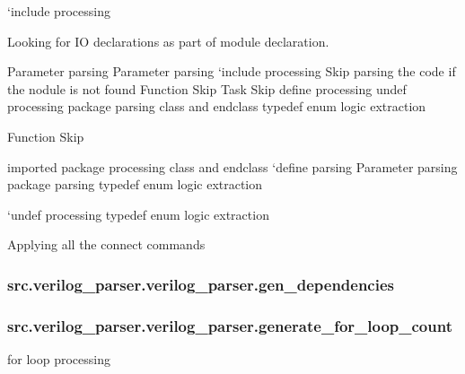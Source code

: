 `include processing

Looking for I\-O declarations as part of module declaration.

Parameter parsing Parameter parsing `include processing Skip parsing the code if the nodule is not found Function Skip Task Skip {\ttfamily define processing }undef processing package parsing class and endclass typedef enum logic extraction

Function Skip

imported package processing class and endclass `define parsing Parameter parsing package parsing typedef enum logic extraction

`undef processing typedef enum logic extraction

Applying all the connect commands \hypertarget{classsrc_1_1verilog__parser_1_1verilog__parser_a9ca2637cb2fee2c2cc14bef5cefbc55c}{
\subsubsection[{gen\-\_\-dependencies}]{\setlength{\rightskip}{0pt plus 5cm}src.\-verilog\-\_\-parser.\-verilog\-\_\-parser.\-gen\-\_\-dependencies}}\label{classsrc_1_1verilog__parser_1_1verilog__parser_a9ca2637cb2fee2c2cc14bef5cefbc55c}
\hypertarget{classsrc_1_1verilog__parser_1_1verilog__parser_af691444ec4ff5f2e93254ed9b5dffdf3}{
\subsubsection[{generate\-\_\-for\-\_\-loop\-\_\-count}]{\setlength{\rightskip}{0pt plus 5cm}src.\-verilog\-\_\-parser.\-verilog\-\_\-parser.\-generate\-\_\-for\-\_\-loop\-\_\-count}}\label{classsrc_1_1verilog__parser_1_1verilog__parser_af691444ec4ff5f2e93254ed9b5dffdf3}


for loop processing 

